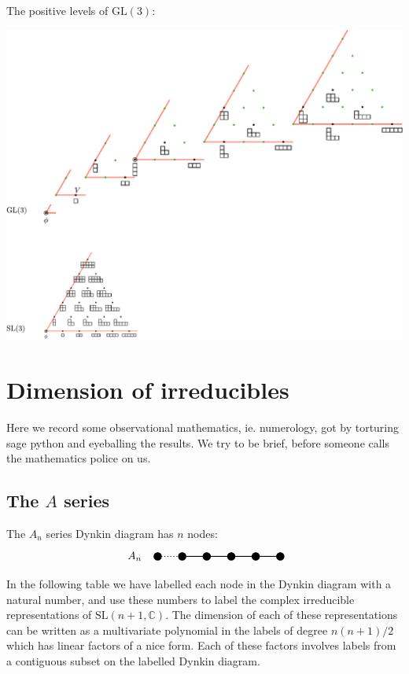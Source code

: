 \documentclass[11pt,oneside]{article}
\newcommand{\Complex}{\mathbb{C}}
\newcommand{\GL}{\mathrm{GL}}
\newcommand{\SL}{\mathrm{SL}}
\begin{document}
The positive levels of $\GL(3)$:
\begin{center}
\includegraphics[scale=0.6]{images/gl3.pdf}
\end{center}

\section{Dimension of irreducibles}


Here we record some observational mathematics, ie. numerology,
got by torturing sage python and eyeballing the results.
We try to be brief, before someone calls the mathematics police on us.

\subsection{The $A$ series}


The $A_n$ series Dynkin diagram has $n$ nodes:
$$ \DynkinAn $$
In the following table we have labelled
each node in the Dynkin diagram with a natural number,
and use these numbers to label the complex irreducible
representations of $\SL(n+1,\Complex)$.
The dimension of each of these representations
can be written as a multivariate polynomial in the labels of degree 
$n(n+1)/2$ which has linear factors of a nice form.
Each of these factors involves labels from a contiguous subset on
the labelled Dynkin diagram.
\end{document}
